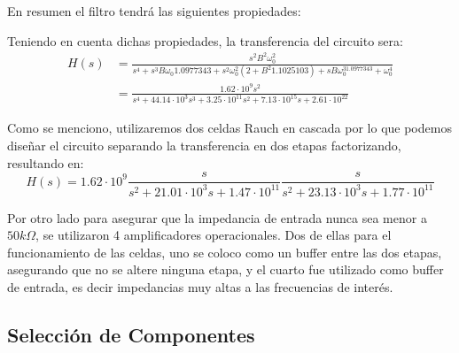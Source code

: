 En resumen el filtro tendrá las siguientes propiedades:

\begin{table}[H]
    \centering
    \caption{Propiedades del Filtro a Dise\~nar}
    \label{tab:TEMPLATE}
\end{table}

Teniendo en cuenta dichas propiedades, la transferencia del circuito sera:
\begin{equation}
\begin{split}
    H(s) &= \frac{s^2 B^2 \omega_0^2}{s^4+s^3 B \omega_0 1.0977343  + s^2 \omega_0^2 (2+B^2 1.1025103) + s B \omega_0^31.0977343 + \omega_0^4}\\
     &= \frac{ 1.62 \cdot 10^9 s^2}{s^4+ 44.14 \cdot 10^3  s^3 +  3.25 \cdot 10^{11} s^2+  7.13 \cdot 10^{15} s+ 2.61 \cdot10^{22}}
\end{split}
\end{equation}

Como se menciono, utilizaremos dos celdas Rauch en cascada por lo que podemos diseñar el circuito separando la transferencia en dos etapas factorizando, resultando en:
\begin{equation}
    \label{ej22eqhf}
    H(s) = 1.62 \cdot 10^9\frac{s}{s^2 + 21.01\cdot 10^3 s + 1.47 \cdot 10^{11}}\frac{s}{s^2 + 23.13\cdot 10^3 s+ 1.77 \cdot 10^{11}}
\end{equation}

Por otro lado para asegurar que la impedancia de entrada nunca sea menor a $50k\Omega$, se utilizaron 4 amplificadores operacionales. Dos de ellas para el funcionamiento de las celdas, uno se coloco como un buffer entre las dos etapas, asegurando que no se altere ninguna etapa, y el cuarto fue utilizado como buffer de entrada, es decir impedancias muy altas a las frecuencias de interés.


\subsection{Selección de Componentes}

